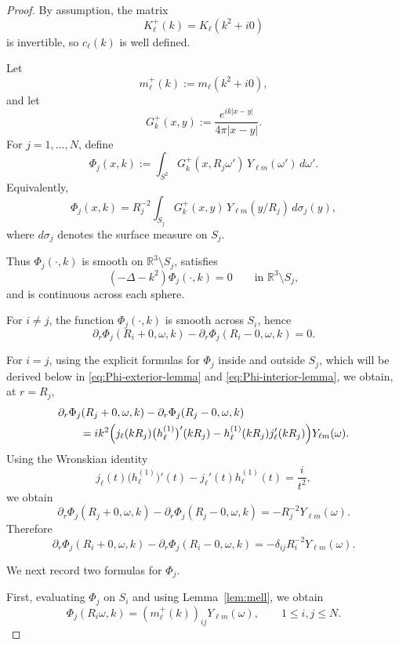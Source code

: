 \documentclass[a4paper,11pt]{article}
\numberwithin{equation}{section}
\newcommand{\R}{\mathbb{R}}
\theoremstyle{definition}
\theoremstyle{remark}
\begin{document}
\begin{proof}
By assumption, the matrix
\[
K_\ell^+(k)=K_\ell(k^2+i0)
\]
is invertible, so $c_\ell(k)$ is well defined.

Let
\[
m_\ell^+(k):=m_\ell(k^2+i0),
\]
and let
\[
G_k^+(x,y):=\frac{e^{ik|x-y|}}{4\pi|x-y|}.
\]
For $j=1,\ldots,N$, define
\[
\Phi_j(x,k)
:=
\int_{S^2} G_k^+(x,R_j\omega')\,Y_{\ell m}(\omega')\,d\omega'.
\]
Equivalently,
\[
\Phi_j(x,k)
=
R_j^{-2}
\int_{S_j} G_k^+(x,y)\,Y_{\ell m}(y/R_j)\,d\sigma_j(y),
\]
where $d\sigma_j$ denotes the surface measure on $S_j$.

Thus $\Phi_j(\cdot,k)$ is smooth on $\R^3\setminus S_j$, satisfies
\[
(-\Delta-k^2)\Phi_j(\cdot,k)=0
\qquad \text{in }\R^3\setminus S_j,
\]
and is continuous across each sphere.

For $i\neq j$, the function $\Phi_j(\cdot,k)$ is smooth across $S_i$, hence
\[
\partial_r\Phi_j(R_i+0,\omega,k)-\partial_r\Phi_j(R_i-0,\omega,k)=0.
\]

For $i=j$, using the explicit formulas for $\Phi_j$ inside and outside $S_j$,
which will be derived below in \eqref{eq:Phi-exterior-lemma} and
\eqref{eq:Phi-interior-lemma}, we obtain, at $r=R_j$,
\begin{align*}
&\partial_r\Phi_j(R_j+0,\omega,k)-\partial_r\Phi_j(R_j-0,\omega,k)
\\
&\qquad
=
ik^2\Bigl(
j_\ell(kR_j)\bigl(h_\ell^{(1)}\bigr)'(kR_j)
-
h_\ell^{(1)}(kR_j)j_\ell'(kR_j)
\Bigr)Y_{\ell m}(\omega).
\end{align*}
Using the Wronskian identity
\[
j_\ell(t)\bigl(h_\ell^{(1)}\bigr)'(t)-j_\ell'(t)h_\ell^{(1)}(t)
=
\frac{i}{t^2},
\]
we obtain
\[
\partial_r\Phi_j(R_j+0,\omega,k)-\partial_r\Phi_j(R_j-0,\omega,k)
=
-R_j^{-2}Y_{\ell m}(\omega).
\]
Therefore
\begin{equation}\label{eq:jump-Phi-lemma}
\partial_r\Phi_j(R_i+0,\omega,k)-\partial_r\Phi_j(R_i-0,\omega,k)
=
-\delta_{ij}R_i^{-2}Y_{\ell m}(\omega).
\end{equation}

We next record two formulas for $\Phi_j$.

First, evaluating $\Phi_j$ on $S_i$ and using Lemma~\ref{lem:mell}, we obtain
\begin{equation}\label{eq:trace-Phi-lemma}
\Phi_j(R_i\omega,k)
=
(m_\ell^+(k))_{ij}Y_{\ell m}(\omega),
\qquad 1\le i,j\le N.
\end{equation}


\end{proof}
\end{document}
